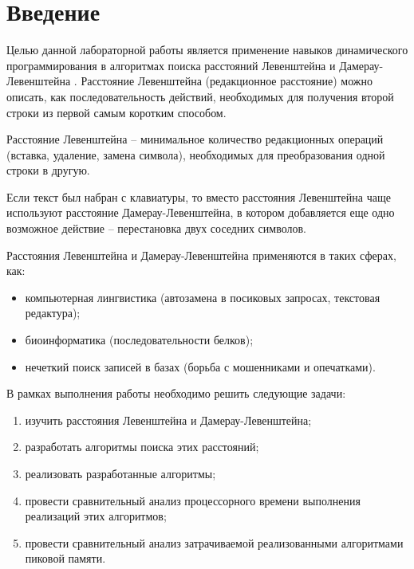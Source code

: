 \chapter*{Введение}

Целью данной лабораторной работы является применение навыков динамического программирования в алгоритмах поиска расстояний Левенштейна и Дамерау-Левенштейна \cite{Levenshtein}.
Расстояние Левенштейна (редакционное расстояние) можно описать, как последовательность действий, необходимых для получения второй строки из первой самым коротким способом. 

Расстояние Левенштейна – минимальное количество редакционных операций (вставка, удаление, замена символа), необходимых для преобразования одной строки в другую. 

Если текст был набран с клавиатуры, то вместо расстояния Левенштейна чаще используют расстояние Дамерау-Левенштейна, в котором добавляется еще одно возможное действие -- перестановка двух соседних символов.

Расстояния Левенштейна и Дамерау-Левенштейна применяются в таких сферах, как: 
\begin{itemize}
	\item компьютерная лингвистика (автозамена в посиковых запросах, текстовая редактура);
	\item биоинформатика (последовательности белков);
	\item нечеткий поиск записей в базах (борьба с мошенниками и опечатками).
\end{itemize}

В рамках выполнения работы необходимо решить следующие задачи: 
\begin{enumerate}[label={\arabic*)}]
	\item изучить расстояния Левенштейна и Дамерау-Левенштейна;
	\item разработать алгоритмы поиска этих расстояний;
	\item реализовать разработанные алгоритмы;
	\item провести сравнительный анализ процессорного времени выполнения реализаций этих алгоритмов;
	\item провести сравнительный анализ затрачиваемой реализованными алгоритмами пиковой памяти.
\end{enumerate}
